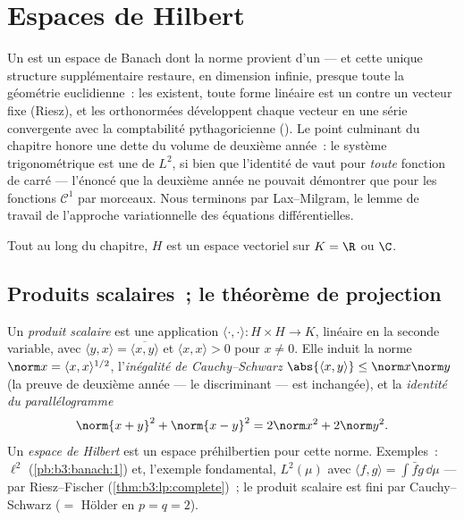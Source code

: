 \chapter{Espaces de Hilbert}\label{ch:b3:hilbert}

Un  est un espace de Banach dont la norme
provient d'un  --- et cette unique structure
supplémentaire restaure, en dimension infinie, presque toute la
géométrie euclidienne~: les  existent,
toute forme linéaire  est un  contre un
vecteur fixe (Riesz), et les  orthonormées développent
chaque vecteur en une série convergente avec la comptabilité
pythagoricienne (). Le point culminant du chapitre
honore une dette du volume de deuxième année~: le système
trigonométrique est une  de $L^2$, si bien que
l'identité de  vaut pour \emph{toute} fonction de carré
 --- l'énoncé que la deuxième année ne pouvait
démontrer que pour les fonctions $\mathcal C^1$ par morceaux.
Nous terminons par Lax--Milgram, le lemme de travail de
l'approche variationnelle des équations différentielles.

Tout au long du chapitre, $H$ est un espace vectoriel sur
$K = \R$ ou $\C$.

\section{Produits scalaires~; le théorème de projection}

\begin{definition}\label{def:b3:hilbert:inner}
Un \emph{produit scalaire} est une
application $\langle \cdot,\cdot\rangle \colon H\times H \to
K$, linéaire en la seconde variable, avec $\langle y, x\rangle
= \overline{\langle x, y\rangle}$ et $\langle x, x\rangle > 0$
pour $x \neq 0$. Elle induit la norme $\norm x = \langle x,
x\rangle^{1/2}$, l'\emph{inégalité de Cauchy--Schwarz}
$\abs{\langle x, y\rangle} \leq \norm x\norm y$ (la preuve de
deuxième année --- le discriminant --- est inchangée), et la
\emph{identité du parallélogramme}
\[
\norm{x + y}^2 + \norm{x - y}^2 = 2\norm x^2 + 2\norm y^2 .
\]
Un \emph{espace de Hilbert} est un
espace préhilbertien  pour cette norme. Exemples~:
$\ell^2$ (\cref{pb:b3:banach:1}) et, l'exemple fondamental,
$L^2(\mu)$ avec $\langle f, g\rangle = \int\bar fg\,\dd\mu$
---  par Riesz--Fischer (\cref{thm:b3:lp:complete})~;
le produit scalaire est fini par Cauchy--Schwarz ($=$ Hölder
en $p = q = 2$).
\end{definition}

